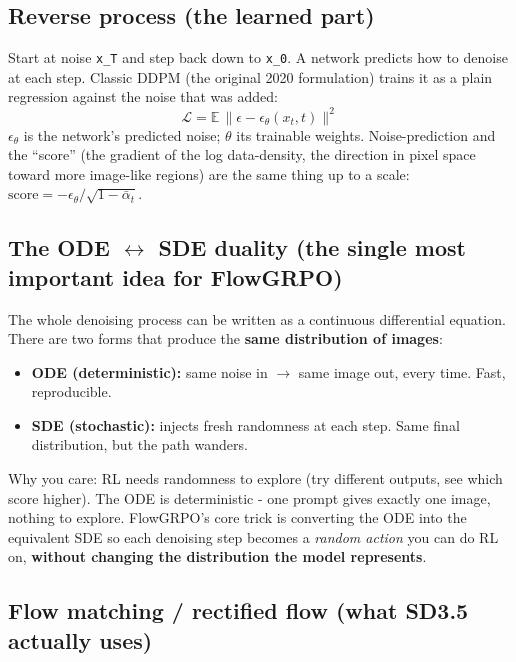 \documentclass[11pt]{article}
\newcommand{\code}[1]{\texttt{\small #1}}
\begin{document}
\subsection{Reverse process (the learned part)}

Start at noise \code{x\_T} and step back down to \code{x\_0}. A network predicts how
to denoise at each step. Classic DDPM (the original 2020 formulation) trains it as a
plain regression against the noise that was added:
\[
\mathcal L = \mathbb E \,\lVert \epsilon - \epsilon_\theta(x_t, t)\rVert^2
\]
$\epsilon_\theta$ is the network's predicted noise; $\theta$ its trainable weights.
Noise-prediction and the ``score'' (the gradient of the log data-density, the
direction in pixel space toward more image-like regions) are the same thing up to a
scale: $\text{score} = -\epsilon_\theta / \sqrt{1-\bar\alpha_t}$.

\subsection{The ODE $\leftrightarrow$ SDE duality (the single most important idea for FlowGRPO)}

The whole denoising process can be written as a continuous differential equation.
There are two forms that produce the \textbf{same distribution of images}:
\begin{itemize}
\item \textbf{ODE (deterministic):} same noise in $\to$ same image out, every time.
Fast, reproducible.
\item \textbf{SDE (stochastic):} injects fresh randomness at each step. Same final
distribution, but the path wanders.
\end{itemize}
Why you care: RL needs randomness to explore (try different outputs, see which score
higher). The ODE is deterministic - one prompt gives exactly one image, nothing to
explore. FlowGRPO's core trick is converting the ODE into the equivalent SDE so each
denoising step becomes a \textit{random action} you can do RL on, \textbf{without
changing the distribution the model represents}.

\subsection{Flow matching / rectified flow (what SD3.5 actually uses)}
\end{document}
